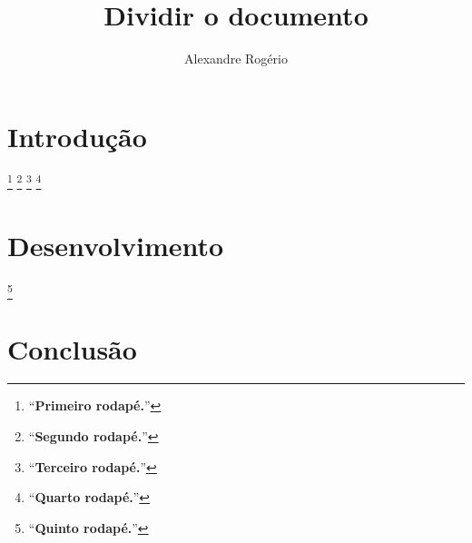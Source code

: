 \documentclass{article}
\begin{document}
	\title{\textbf{{\Huge Dividir o documento}}}
	\author{Alexandre Rogério}
	\maketitle
	\thispagestyle{empty}
	\newpage
	
	\setcounter{page}{1}
	\tableofcontents
	\newpage
	
	\listoffigures
	\newpage
	
	\listoftables
	\newpage
	
	\setcounter{page}{1}
	
	\section{Introdução}
		
		\footnote{\enquote{\textbf{Primeiro rodapé.}}}
		\footnote{\enquote{\textbf{Segundo rodapé.}}}
		\footnote{\enquote{\textbf{Terceiro rodapé.}}}
		\footnote{\enquote{\textbf{Quarto rodapé.}}}
	\section{Desenvolvimento}
		
		\footnote{\enquote{\textbf{Quinto rodapé.}}}
	\section{Conclusão}
		
\end{document}
